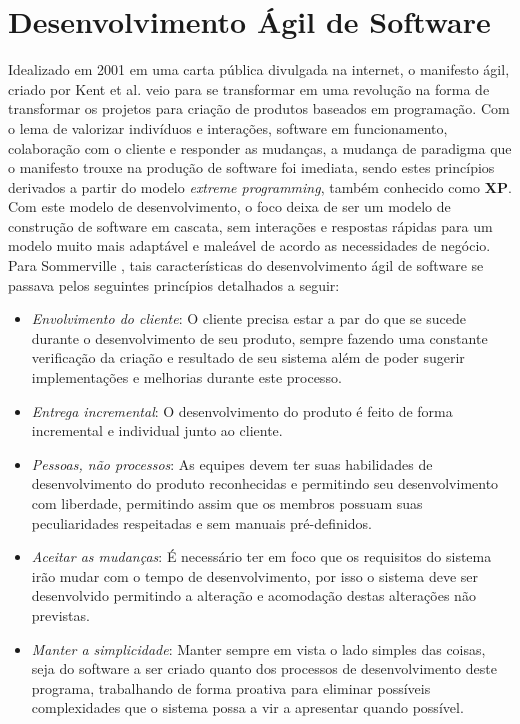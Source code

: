 \section{Desenvolvimento Ágil de Software}
Idealizado em 2001 em uma carta pública divulgada na internet, o manifesto ágil, criado por Kent et al. \cite{agilemanifesto} veio para se transformar em uma revolução na forma de transformar os projetos para criação de produtos baseados em programação. Com o lema de valorizar indivíduos e interações, software em funcionamento, colaboração com o cliente e responder as mudanças, a mudança de paradigma que o manifesto trouxe na produção de software foi imediata, sendo estes princípios derivados a partir do modelo \textit{extreme programming}, também conhecido como \textbf{XP}. Com este modelo de desenvolvimento, o foco deixa de ser um modelo de construção de software em cascata, sem interações e respostas rápidas para um modelo muito mais adaptável e maleável de acordo as necessidades de negócio. Para Sommerville \cite{Sommerville07}, tais características do desenvolvimento ágil de software se passava pelos seguintes princípios detalhados a seguir:
\begin{itemize}
    \item \textit{Envolvimento do cliente}: O cliente precisa estar a par do que se sucede durante o desenvolvimento de seu produto, sempre fazendo uma constante verificação da criação e resultado de seu sistema além de poder sugerir implementações e melhorias durante este processo.
    \item \textit{Entrega incremental}: O desenvolvimento do produto é feito de forma incremental e individual junto ao cliente.
    \item \textit{Pessoas, não processos}: As equipes devem ter suas habilidades de desenvolvimento do produto reconhecidas e permitindo seu desenvolvimento com liberdade, permitindo assim que os membros possuam suas peculiaridades respeitadas e sem manuais pré-definidos.
    \item \textit{Aceitar as mudanças}: É necessário ter em foco que os requisitos do sistema irão mudar com o tempo de desenvolvimento, por isso o sistema deve ser desenvolvido permitindo a alteração e acomodação destas alterações não previstas.
    \item \textit{Manter a simplicidade}: Manter sempre em vista o lado simples das coisas, seja do software a ser criado quanto dos processos de desenvolvimento deste programa, trabalhando de forma proativa para eliminar possíveis complexidades que o sistema possa a vir a apresentar quando possível.
\end{itemize}


